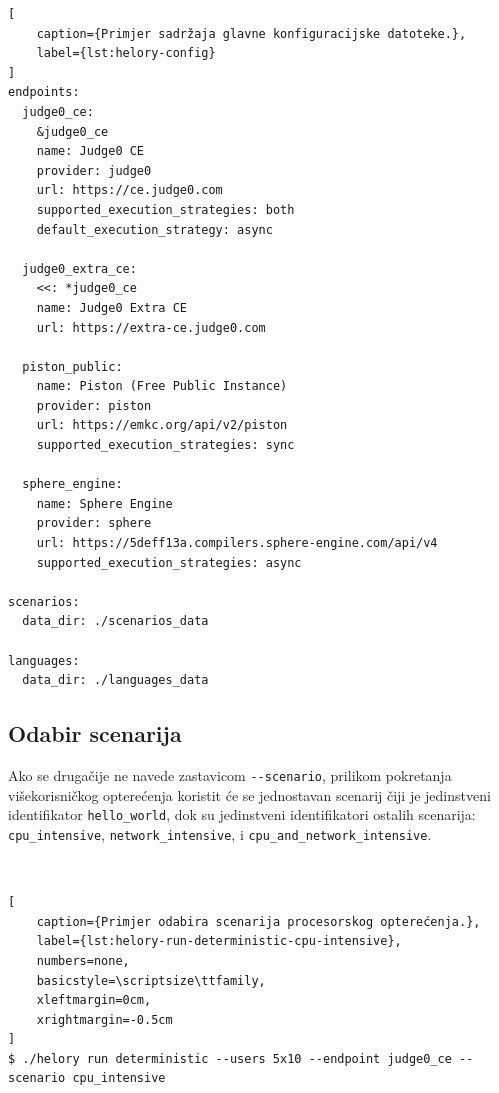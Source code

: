 \documentclass[times, utf8, diplomski]{fer}
\begin{document}
\begin{lstlisting}[
    caption={Primjer sadržaja glavne konfiguracijske datoteke.},
    label={lst:helory-config}
]
endpoints:
  judge0_ce:
    &judge0_ce
    name: Judge0 CE
    provider: judge0
    url: https://ce.judge0.com
    supported_execution_strategies: both
    default_execution_strategy: async

  judge0_extra_ce:
    <<: *judge0_ce
    name: Judge0 Extra CE
    url: https://extra-ce.judge0.com

  piston_public:
    name: Piston (Free Public Instance)
    provider: piston
    url: https://emkc.org/api/v2/piston
    supported_execution_strategies: sync

  sphere_engine:
    name: Sphere Engine
    provider: sphere
    url: https://5deff13a.compilers.sphere-engine.com/api/v4
    supported_execution_strategies: async

scenarios:
  data_dir: ./scenarios_data

languages:
  data_dir: ./languages_data
\end{lstlisting}

\pagebreak

\subsection{Odabir scenarija}
Ako se drugačije ne navede zastavicom \lstinline{--scenario}, prilikom pokretanja višekorisničkog opterećenja koristit će se jednostavan scenarij čiji je jedinstveni identifikator \lstinline{hello_world}, dok su jedinstveni identifikatori ostalih scenarija: \lstinline{cpu_intensive}, \lstinline{network_intensive}, i \lstinline{cpu_and_network_intensive}.

\

\begin{lstlisting}[
    caption={Primjer odabira scenarija procesorskog opterećenja.},
    label={lst:helory-run-deterministic-cpu-intensive},
    numbers=none,
    basicstyle=\scriptsize\ttfamily,
    xleftmargin=0cm,
    xrightmargin=-0.5cm
]
$ ./helory run deterministic --users 5x10 --endpoint judge0_ce --scenario cpu_intensive
\end{lstlisting}
\end{document}
